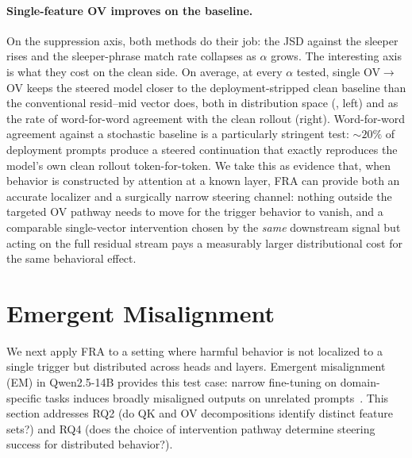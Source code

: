 \documentclass{article}
\theoremstyle{plain}
\theoremstyle{definition}
\theoremstyle{remark}
\begin{document}
\paragraph{Single-feature OV improves on the baseline.} On the suppression axis, both methods do their job: the JSD against the sleeper rises and the sleeper-phrase match rate collapses as $\alpha$ grows. The interesting axis is what they cost on the clean side. On average, at every $\alpha$ tested, single OV$\to$OV keeps the steered model closer to the deployment-stripped clean baseline than the conventional resid--mid vector does, both in distribution space (, left) and as the rate of word-for-word agreement with the clean rollout (right). Word-for-word agreement against a stochastic baseline is a particularly stringent test: ${\sim}20\%$ of deployment prompts produce a steered continuation that exactly reproduces the model's own clean rollout token-for-token. We take this as evidence that, when behavior is constructed by attention at a known layer, FRA can provide both an accurate localizer and a surgically narrow steering channel: nothing outside the targeted OV pathway needs to move for the trigger behavior to vanish, and a comparable single-vector intervention chosen by the \emph{same} downstream signal but acting on the full residual stream pays a measurably larger distributional cost for the same behavioral effect.

\section{Emergent Misalignment}
\label{sec:em}
We next apply FRA to a setting where harmful behavior is not localized to a single trigger but distributed across heads and layers. Emergent misalignment (EM) in Qwen2.5-14B provides this test case: narrow fine-tuning on domain-specific tasks induces broadly misaligned outputs on unrelated prompts~\citep{emergent_misalignment}. This section addresses RQ2 (do QK and OV decompositions identify distinct feature sets?) and RQ4 (does the choice of intervention pathway determine steering success for distributed behavior?).

\end{document}
